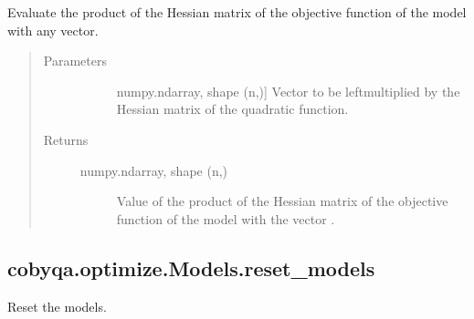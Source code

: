 \documentclass[letterpaper,10pt,english]{sphinxmanual}
\begin{document}
\begin{fulllineitems}
\begin{fulllineitems}
\label{\detokenize{refs/generated/cobyqa.optimize.Models.obj_hessp:cobyqa.optimize.Models.obj_hessp}}
\sphinxAtStartPar
Evaluate the product of the Hessian matrix of the objective function of
the model with any vector.
\begin{quote}\begin{description}
\item[{Parameters}] \leavevmode\begin{description}
\item[{}] \leavevmode{[}numpy.ndarray, shape (n,){]}
\sphinxAtStartPar
Vector to be left\sphinxhyphen{}multiplied by the Hessian matrix of the quadratic
function.

\end{description}

\item[{Returns}] \leavevmode\begin{description}
\item[{numpy.ndarray, shape (n,)}] \leavevmode
\sphinxAtStartPar
Value of the product of the Hessian matrix of the objective function
of the model with the vector .

\end{description}

\end{description}\end{quote}

\end{fulllineitems}



\subsection{cobyqa.optimize.Models.reset\_models}
\label{\detokenize{refs/generated/cobyqa.optimize.Models.reset_models:cobyqa-optimize-models-reset-models}}\label{\detokenize{refs/generated/cobyqa.optimize.Models.reset_models::doc}}

\begin{fulllineitems}
\label{\detokenize{refs/generated/cobyqa.optimize.Models.reset_models:cobyqa.optimize.Models.reset_models}}
\sphinxAtStartPar
Reset the models.


\end{fulllineitems}
\end{fulllineitems}
\end{document}
